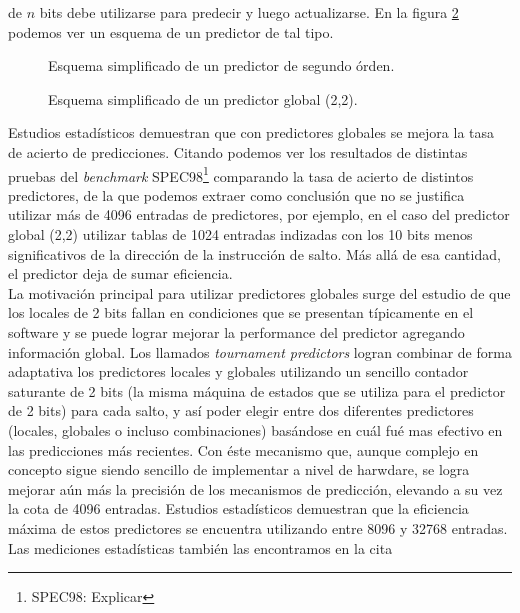 de $n$ bits debe utilizarse para predecir y luego actualizarse. En la figura 
\ref{fig:C02-global_predictor_2_2} podemos ver un esquema de un predictor de 
tal tipo.
\begin{figure}
  \centering
  \resizebox{\textwidth}{!}{}
  \captionsetup{justification=centering}
  \caption{Esquema simplificado de un predictor de segundo órden.}
  \label{fig:C02-second_order_predictor}
\end{figure}
\begin{figure}
  \centering
  \resizebox{\textwidth}{!}{}
  \captionsetup{justification=centering}
  \caption{Esquema simplificado de un predictor global (2,2).}
  \label{fig:C02-global_predictor_2_2}
\end{figure}
Estudios estadísticos demuestran que con predictores globales se mejora la 
tasa de acierto de predicciones. Citando \cite[sección, 3.3]{caaqa} 
podemos ver los resultados de distintas pruebas del \emph{benchmark} 
SPEC98\footnote{SPEC98: Explicar} comparando la tasa de acierto de distintos 
predictores, de la que podemos extraer como conclusión que no se justifica 
utilizar más de 4096 entradas de predictores, por ejemplo, en el caso del 
predictor global (2,2) utilizar tablas de 1024 entradas indizadas con los 10 
bits menos significativos de la dirección de la instrucción de salto. Más allá 
de esa cantidad, el predictor deja de sumar eficiencia.\\
La motivación principal para utilizar predictores globales surge del estudio de 
que los locales de 2 bits fallan en condiciones que se presentan típicamente en 
el software y se puede lograr mejorar la performance del predictor agregando 
información global. Los llamados \emph{tournament predictors} logran combinar 
de forma adaptativa los predictores locales y globales utilizando un sencillo 
contador saturante de 2 bits (la misma máquina de estados que se utiliza para 
el predictor de 2 bits) para cada salto, y así poder elegir entre dos diferentes 
predictores (locales, globales o incluso combinaciones) basándose en cuál fué 
mas efectivo en las predicciones más recientes. Con éste mecanismo que, aunque 
complejo en concepto sigue siendo sencillo de implementar a nivel de harwdare, 
se logra mejorar aún más la precisión de los mecanismos de predicción, elevando 
a su vez la cota de 4096 entradas. Estudios estadísticos demuestran que la 
eficiencia máxima de estos predictores se encuentra utilizando entre 8096 y 
32768 entradas. Las mediciones estadísticas también las encontramos en la cita 
